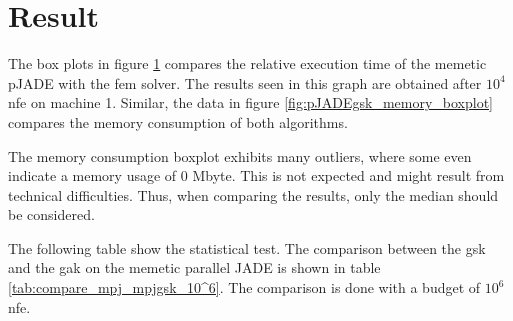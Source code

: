 \documentclass[./\jobname.tex]{subfiles}
\begin{document}
\section{Result}

The box plots in figure \ref{fig:pJADEgsk_time_boxplot} compares the relative execution time of the memetic pJADE with the \gls{fem} solver. The results seen in this graph are obtained after $10^4$ \gls{nfe} on machine 1. Similar, the data in figure \ref{fig:pJADEgsk_memory_boxplot} compares the memory consumption of both algorithms. 

The memory consumption boxplot exhibits many outliers, where some even indicate a memory usage of 0 Mbyte. This is not expected and might result from technical difficulties. Thus, when comparing the results, only the median should be considered. 

The following table show the statistical test. The comparison between the \gls{gsk} and the \gls{gak} on the memetic parallel JADE is shown in table \ref{tab:compare_mpj_mpjgsk_10^6}. The comparison is done with a budget of $10^6$ \gls{nfe}. 

\begin{figure}[H]
	\centering
	\noindent{}
	\label{fig:pJADEgsk_time_boxplot}
\end{figure}
\end{document}
